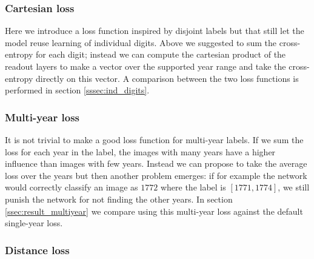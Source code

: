 

\subsubsection{Cartesian loss} \label{sssec:cartesian}

%

Here we introduce a loss function inspired by disjoint labels but that still let the model reuse learning of individual digits. Above we suggested to sum the cross-entropy for each digit; instead we can compute the cartesian product of the readout layers to make a vector over the supported year range and take the cross-entropy directly on this vector. A comparison between the two loss functions is performed in section \ref{sssec:ind_digits}.


\subsubsection{Multi-year loss} \label{sssec:alt_multiyear}

It is not trivial to make a good loss function for multi-year labels. If we sum the loss for each year in the label, the images with many years have a higher influence than images with few years. Instead we can propose to take the average loss over the years but then another problem emerges: if for example the network would correctly classify an image as $1772$ where the label is $[1771, 1774]$, we still punish the network for not finding the other years.
In section \ref{ssec:result_multiyear} we compare using this multi-year loss against the default single-year loss.

\subsubsection{Distance loss}

